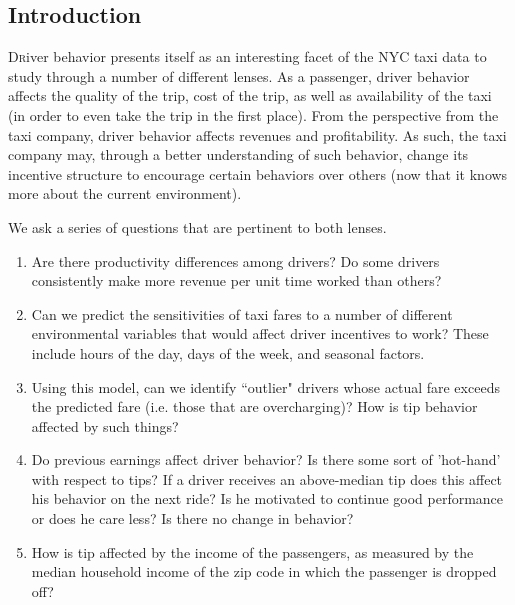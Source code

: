 \documentclass[twoside]{article}
\begin{document}
\begin{multicols}{2} %

\section{Introduction}

\lettrine[nindent=0em,lines=3]{D} river behavior presents itself as an interesting facet of the NYC taxi data to study through a number of different lenses. As a passenger, driver behavior affects the quality of the trip, cost of the trip, as well as availability of the taxi (in order to even take the trip in the first place). From the perspective from the taxi company, driver behavior affects revenues and profitability. As such, the taxi company may, through a better understanding of such behavior, change its incentive structure to encourage certain behaviors over others (now that it knows more about the current environment). 

We ask a series of questions that are pertinent to both lenses. 
\begin{enumerate}
\item Are there productivity differences among drivers? Do some drivers consistently make more revenue per unit time worked than others? 
\item Can we predict the sensitivities of taxi fares to a number of different environmental variables that would affect driver incentives to work? These include hours of the day, days of the week, and seasonal factors.
\item Using this model, can we identify ``outlier" drivers whose actual fare exceeds the predicted fare (i.e. those that are overcharging)? How is tip behavior affected by such things?
\item Do previous earnings affect driver behavior? Is there some sort of 'hot-hand' with respect to tips? If a driver receives an above-median tip does this affect his behavior on the next ride? Is he motivated to continue good performance or does he care less? Is there no change in behavior?
\item How is tip affected by the income of the passengers, as measured by the median household income of the zip code in which the passenger is dropped off?

\end{enumerate}



\end{multicols}
\end{document}
